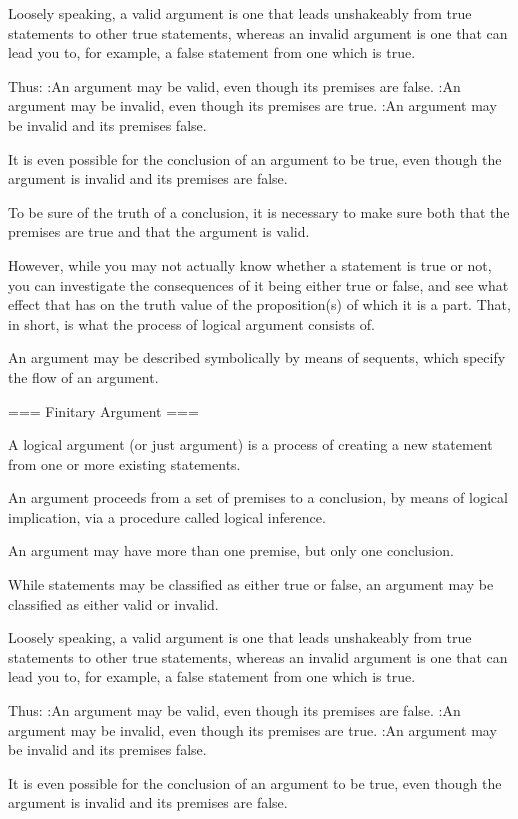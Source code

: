 Loosely speaking, a valid argument is one that leads unshakeably from true statements to other true statements, whereas an invalid argument is one that can lead you to, for example, a false statement from one which is true.


Thus:
:An argument may be valid, even though its premises are false.
:An argument may be invalid, even though its premises are true.
:An argument may be invalid and its premises false.

It is even possible for the conclusion of an argument to be true, even though the argument is invalid and its premises are false.


To be sure of the truth of a conclusion, it is necessary to make sure both that the premises are true and that the argument is valid.


However, while you may not actually know whether a statement is true or not, you can investigate the consequences of it being either true or false, and see what effect that has on the truth value of the proposition(s) of which it is a part. That, in short, is what the process of logical argument consists of.


An argument may be described symbolically by means of sequents, which specify the flow of an argument.


=== Finitary Argument ===

A logical argument (or just argument) is a process of creating a new statement from one or more existing statements.

An argument proceeds from a set of premises to a conclusion, by means of logical implication, via a procedure called logical inference.


An argument may have more than one premise, but only one conclusion.


While statements may be classified as either true or false, an argument may be classified as either valid or invalid.


Loosely speaking, a valid argument is one that leads unshakeably from true statements to other true statements, whereas an invalid argument is one that can lead you to, for example, a false statement from one which is true.


Thus:
:An argument may be valid, even though its premises are false.
:An argument may be invalid, even though its premises are true.
:An argument may be invalid and its premises false.

It is even possible for the conclusion of an argument to be true, even though the argument is invalid and its premises are false.


